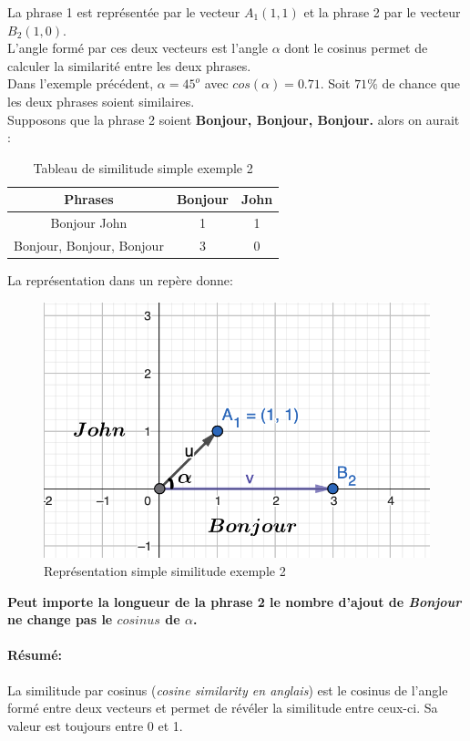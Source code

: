 \documentclass[a4paper, 14pt]{article}
\begin{document}
	La phrase 1 est représentée par le vecteur $A_{1}(1, 1)$ et la phrase 2 par le vecteur $B_{2}(1, 0)$.\\
	L'angle formé par ces deux vecteurs est l'angle $\alpha$ dont le cosinus permet de calculer la similarité entre les deux phrases.\\
	Dans l'exemple précédent, $\alpha=45^{o}$ avec $cos(\alpha)=0.71$. Soit $71\%$ de chance que les deux phrases soient similaires.\\
	Supposons que la phrase 2 soient \textbf{Bonjour, Bonjour, Bonjour.} alors on aurait :
		\begin{table}[H]
		\centering
		\begin{tabular}{|c|c|c|}
			\hline
			\textbf{Phrases} & \textbf{Bonjour} & \textbf{John} \\
			\hline
			Bonjour John & 1 & 1 \\
			Bonjour, Bonjour, Bonjour  & 3 & 0 \\
			\hline
		\end{tabular}
		\caption{Tableau de similitude simple exemple 2}
		\label{tab:exemplesimple}
	\end{table}
	La représentation dans un repère donne:
	 \begin{figure}[H]
		\includegraphics[scale=0.5, width=15cm]{./img/vecteur_exemple_simple_example2.png}
		\caption{Représentation simple similitude exemple 2}
	\end{figure}
	\textbf{Peut importe la longueur de  la phrase 2 le nombre d'ajout de \textit{Bonjour} ne change pas le $cosinus$ de $\alpha$.}
    \paragraph{Résumé:} La similitude par cosinus (\textit{cosine similarity en anglais}) est le cosinus de l'angle formé entre deux vecteurs et permet de révéler la similitude entre ceux-ci. Sa valeur est toujours entre 0 et 1.
\end{document}
